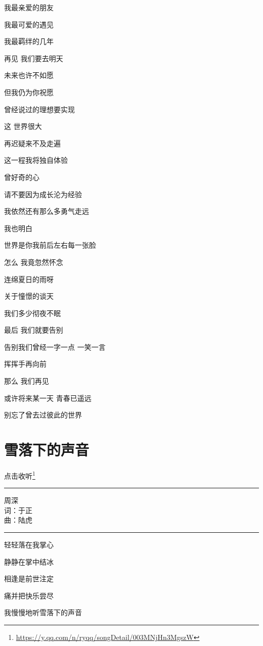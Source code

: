 \documentclass[]{ctexbook}
\renewcommand{\href}[2]{#2\footnote{\url{#1}}}
\begin{document}
我最亲爱的朋友

我最可爱的遇见

我最羁绊的几年

再见 我们要去明天

未来也许不如愿

但我仍为你祝愿

曾经说过的理想要实现

这 世界很大

再迟疑来不及走遍

这一程我将独自体验

曾好奇的心

请不要因为成长沦为经验

我依然还有那么多勇气走远

我也明白

世界是你我前后左右每一张脸

怎么 我竟忽然怀念

连绵夏日的雨呀

关于憧憬的谈天

我们多少彻夜不眠

最后 我们就要告别

告别我们曾经一字一点 一笑一言

挥挥手再向前

那么 我们再见

或许将来某一天 青春已遥远

别忘了曾去过彼此的世界

\section*{雪落下的声音}\label{sound-of-the-snow}


\href{https://y.qq.com/n/ryqq/songDetail/003MNjHn3MgszW}{点击收听}

\begin{center}\rule{0.5\linewidth}{0.5pt}\end{center}

周深\\
词：于正\\
曲：陆虎

\begin{center}\rule{0.5\linewidth}{0.5pt}\end{center}

轻轻落在我掌心

静静在掌中结冰

相逢是前世注定

痛并把快乐尝尽

我慢慢地听雪落下的声音
\end{document}
